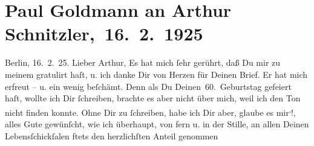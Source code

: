 

         
         \renewcommand{\erwaehntePersonen}{Personen: Paul Goldmann}
         \renewcommand{\erwaehnteInstitutionen}{Institutionen: S. Fischer Verlag}
         \renewcommand{\erwaehnteOrte}{Orte: Berlin, Wien}
         \renewcommand{\erwaehnteWerke}{Werke: Berliner Theater. (»Der Schleier der Beatrice« von Arthur Schnitzler.), Der Schleier der Beatrice. Schauspiel in fünf Akten, Komödie der Worte. Drei Einakter, Lebendige Stunden. Vier Einakter, Neue Freie Presse, Stunde des Erkennens, Tagebuch}
               \section[ Paul Goldmann an Arthur Schnitzler, 16. 2. 1925]{ Paul Goldmann an Arthur Schnitzler, 16. 2. 1925}\nopagebreak{}\rehead{ }\begin{ledgroupsized}[t]{13cm}\normalsize\beginnumbering{} \toendnotes[C]{\smallbreak\pagebreak[2]} 
\toendnotes[C]{\smallbreak}\pstart
           {\pb}Berlin, 16. 2. 25.\pend
           \pstart{}Lieber Arthur,\pend\pstart
           Es hat mich ſehr gerührt, daß Du mir zu meinem \label{K_L03478-1v}\label{K_L03478-1h} gratulirt haſt, u. ich danke Dir von Herzen für Deinen Brief. Er hat mich
               erfreut – u. ein wenig beſchämt. Denn als Du \label{K_L03478-2v}\label{K_L03478-2h} Deinen 60. Geburtstag gefeiert haſt, wollte ich Dir ſchreiben, brachte es
               aber nicht über mich, weil ich den Ton nicht finden konnte. Ohne Dir zu ſchreiben,
               habe ich Dir aber, glaube es mir\substVorne{}\textsuperscript{,}\substDazwischen{}!\substHinten{}, alles Gute gewünſcht, wie ich überhaupt, von fern {\pb}u. in  der
               Stille, an allen Deinen Lebensſchickſalen ftets den herzlichſten Anteil genommen

\end{ledgroupsized}
